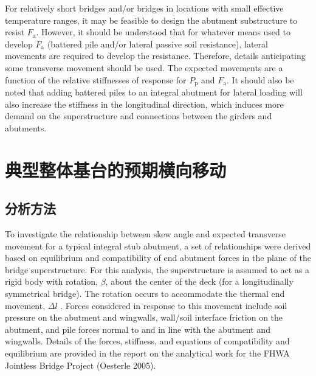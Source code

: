 For relatively short bridges and/or bridges in locations with small effective temperature ranges, it may be feasible to design the abutment substructure to resist $F_\text{a}$. However, it should be understood that for whatever means used to develop $F_\text{a}$ (battered pile and/or lateral passive soil resistance), lateral movements are required to develop the resistance. Therefore, details anticipating some transverse movement should be used. The expected movements are a function of the relative stiffnesses of response for $P_\text{p}$ and $F_\text{a}$. It should also be noted that adding battered piles to an integral abutment for lateral loading will also increase the stiffness in the longitudinal direction, which induces more demand on the superstructure and connections between the girders and abutments.

\section{典型整体基台的预期横向移动}
\subsection{分析方法}
To investigate the relationship between skew angle and expected transverse movement for a typical integral stub abutment, a set of relationships were derived based on equilibrium and compatibility of end abutment forces in the plane of the bridge superstructure. For this analysis, the superstructure is assumed to act as a rigid body with rotation, $\beta$, about the center of the deck (for a longitudinally symmetrical bridge). The rotation occurs to accommodate the thermal end movement, $\Delta l$ . Forces considered in response to this movement include soil pressure on the abutment and wingwalls, wall/soil interface friction on the abutment, and pile forces normal to and in line with the abutment and wingwalls. Details of the forces, stiffness, and equations of compatibility and equilibrium are provided in the report on the analytical work for the FHWA Jointless Bridge Project (Oesterle 2005).

